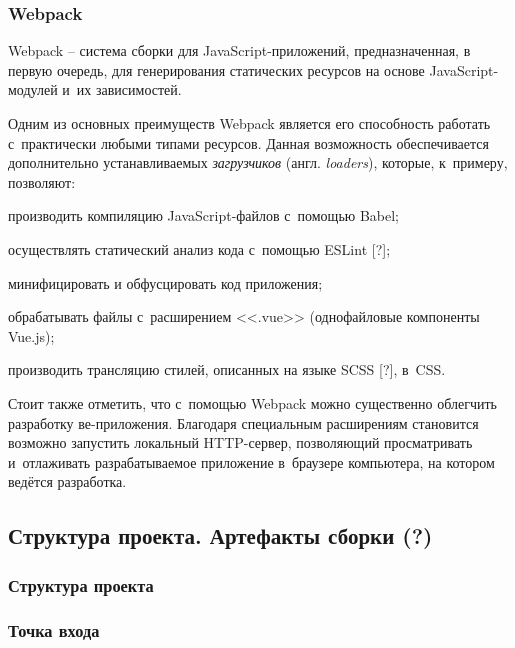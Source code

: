 

\subsubsection{Webpack}

Webpack -- система сборки для JavaScript-приложений, предназначенная, в первую очередь, для генерирования статических ресурсов на основе JavaScript-модулей и~их зависимостей.

Одним из основных преимуществ Webpack является его способность работать с~практически любыми типами ресурсов. Данная возможность обеспечивается дополнительно устанавливаемых \emph{загрузчиков} (англ. \emph{loaders}), которые, к~примеру, позволяют:
\begin{dashitemize}
  \item производить компиляцию JavaScript-файлов с~помощью Babel;
  \item осуществлять статический анализ кода с~помощью ESLint [?];
  \item минифицировать и обфусцировать код приложения;
  \item обрабатывать файлы с~расширением <<.vue>> (однофайловые компоненты Vue.js);
  \item производить трансляцию стилей, описанных на языке SCSS [?], в~CSS.
\end{dashitemize}

Стоит также отметить, что с~помощью Webpack можно существенно облегчить разработку ве-приложения. Благодаря специальным расширениям становится возможно запустить локальный HTTP-сервер, позволяющий просматривать и~отлаживать разрабатываемое приложение в~браузере компьютера, на котором ведётся разработка.



\subsection{Структура проекта. Артефакты сборки (?)}


\subsubsection{Структура проекта}


\subsubsection{Точка входа}


